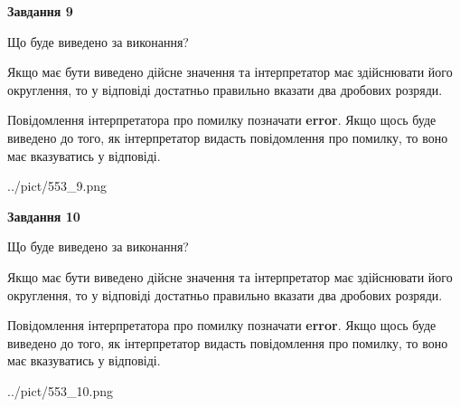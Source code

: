 \documentclass[12pt, ukrainian]{article}
\begin{document}
{\begin {Large}
{\begin {center}\textbf{Завдання 9}\end {center}}\par
Що буде виведено за виконання? \par

Якщо має бути виведено дійсне значення та інтерпретатор має здійснювати його округлення, 
то у відповіді достатньо правильно вказати два дробових розряди.

Повідомлення інтерпретатора про помилку позначати \textbf{error}.
Якщо щось буде виведено до того, як інтерпретатор видасть повідомлення про помилку, 
то воно має вказуватись у відповіді. \par

\begin{center}
	{../pict/553_9.png}
\end{center}
\newpage

{\begin {center}\textbf{Завдання 10}\end {center}}\par
Що буде виведено за виконання? \par

Якщо має бути виведено дійсне значення та інтерпретатор має здійснювати його округлення, 
то у відповіді достатньо правильно вказати два дробових розряди.

Повідомлення інтерпретатора про помилку позначати \textbf{error}.
Якщо щось буде виведено до того, як інтерпретатор видасть повідомлення про помилку, 
то воно має вказуватись у відповіді. \par

\begin{center}
	{../pict/553_10.png}
\end{center}
\newpage

\end {Large}}
\end{document}
